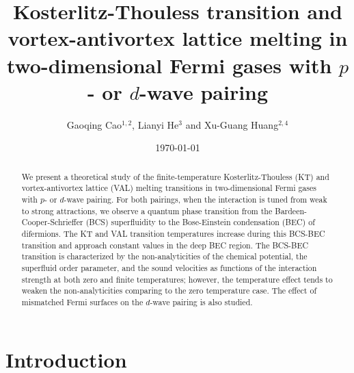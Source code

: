 \documentclass[aps,prd,amsmath,two column,nofootinbib,amssymb,referee]{revtex4}
\begin{document}
\title{Kosterlitz-Thouless transition and vortex-antivortex lattice melting in two-dimensional Fermi gases with $p$- or $d$-wave pairing}

\author{Gaoqing Cao$^{1,2}$, Lianyi He$^{3}$ and Xu-Guang Huang$^{2,4}$}

\date{\today}

\begin{abstract}
We present a theoretical study of the finite-temperature Kosterlitz-Thouless (KT) and vortex-antivortex lattice (VAL) melting transitions in two-dimensional Fermi gases with $p$- or $d$-wave pairing. For both pairings, when the interaction is tuned from weak to strong attractions, we observe a quantum phase transition from the Bardeen-Cooper-Schrieffer (BCS) superfluidity to the Bose-Einstein condensation (BEC) of difermions. The KT and VAL transition temperatures increase during this BCS-BEC transition and approach constant values in the deep BEC region. The BCS-BEC transition is  characterized by the non-analyticities of the chemical potential, the superfluid order parameter, and the sound velocities as functions of the interaction strength at both zero and finite temperatures; however, the temperature effect tends to weaken the non-analyticities comparing to the zero temperature case. The effect of mismatched Fermi surfaces on the $d$-wave pairing is also studied.
\end{abstract}


\maketitle
\section{Introduction}
\end{document}
